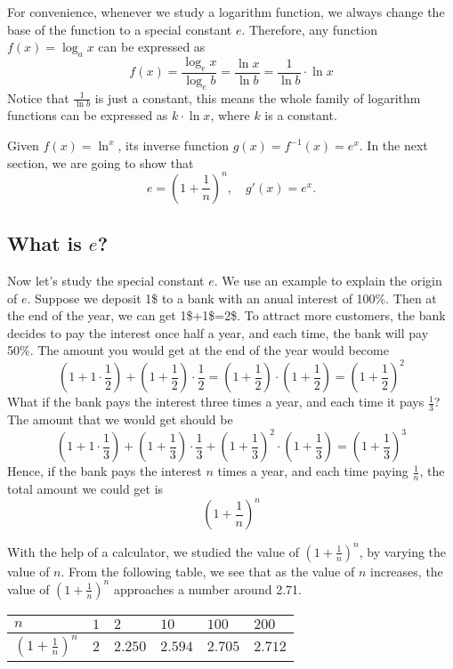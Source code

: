\documentclass[11pt, oneside]{article}   	%
\begin{document}
For convenience, whenever we study a logarithm function, we always change the base of the function to a special constant  $e$. Therefore, any function $f(x)=\log_a x$ can be expressed as \[f(x)=\frac{\log_e x}{\log_e b}= \frac{\ln x}{\ln b}= \frac {1}{\ln b}\cdot \ln x\]
Notice that $\frac{1}{\ln b}$ is just a constant, this means the whole family of logarithm functions can be expressed as $k \cdot \ln x$, where $k$ is a constant.

Given $f(x)=\ln^x$, its inverse function $g(x)=f^{-1}(x)=e^x$. In the next section, we are going to show that 
\[e=\left(1+\frac{1}{n}\right)^n, \quad g'(x)=e^x.\]

\subsection{What is $e$?}
Now let's study the special constant $e$. We use an example to explain the origin of $e$. Suppose we deposit 1\$ to a bank with an anual interest of 100\%. Then at the end of the year, we can get 1\$+1\$=2\$. To attract more customers, the bank decides to pay the interest once half a year, and each time, the bank will pay 50\%. The amount you would get at the end of the year would become 
\[\left(1+1\cdot \frac{1}{2}\right)+\left(1+\frac{1}{2}\right)\cdot \frac{1}{2}=\left(1+\frac{1}{2}\right) \cdot \left(1+\frac{1}{2}\right)=\left(1+\frac{1}{2}\right)^2\]
What if the bank pays the interest three times a year, and each time it pays $\frac{1}{3}$? The amount that we would get should be
\[\left(1+1\cdot \frac{1}{3}\right)+\left(1+\frac{1}{3}\right)\cdot \frac{1}{3}+\left(1+\frac{1}{3}\right)^2 \cdot \left(1+\frac{1}{3}\right)=\left(1+\frac{1}{3}\right)^3\]
Hence, if the bank pays the interest $n$ times a year, and each time paying $\frac{1}{n}$, the total amount we could get is \[\left(1+\frac{1}{n}\right)^n\]

With the help of a calculator, we studied the value of $\left(1+\frac{1}{n}\right)^n$, by varying the value of $n$. From the following table, we see that as the value of $n$ increases, the value of $\left(1+\frac{1}{n}\right)^n$ approaches a number around 2.71. 
\begin{center}
\begin{tabular}{|>{\centering}p{1.5cm}|>{\centering}p{1cm}|>{\centering}p{1cm}|>{\centering}p{1cm}|>{\centering}p{1cm}|>{\centering\arraybackslash}p{1cm}|}
\hline
$n$ & $1$ & $2$ & $10$ & $100$ & $200$\\
\hline
$\left(1+\frac{1}{n}\right)^n$ & $2$ & $2.250$ & $2.594$ & $2.705$ & $2.712$\\
\hline
\end{tabular}
\end{center}
\end{document}
